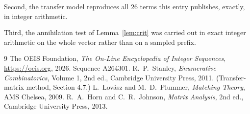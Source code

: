 \documentclass[11pt,a4paper]{article}
\theoremstyle{plain}
\theoremstyle{definition}
\begin{document}
Second, the transfer model reproduces all $26$ terms this entry publishes, exactly, in
integer arithmetic.

Third, the annihilation test of Lemma~\ref{lem:crit} was carried out in exact integer
arithmetic on the whole vector rather than on a sampled prefix.

\begin{thebibliography}{9}
 The OEIS Foundation, \emph{The On-Line Encyclopedia of Integer
Sequences}, \url{https://oeis.org}, 2026. Sequence A264301.
 R.~P.~Stanley, \emph{Enumerative Combinatorics}, Volume 1, 2nd ed.,
Cambridge University Press, 2011. (Transfer-matrix method, Section 4.7.)
 L.~Lov\'asz and M.~D.~Plummer, \emph{Matching Theory}, AMS Chelsea, 2009.
 R.~A.~Horn and C.~R.~Johnson, \emph{Matrix Analysis}, 2nd ed., Cambridge
University Press, 2013.
\end{thebibliography}
\end{document}
